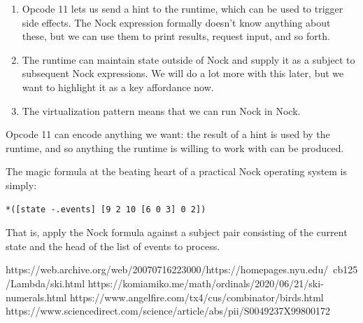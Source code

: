 \begin{enumerate}
  \item  Opcode 11 lets us send a hint to the runtime, which can be used to trigger side effects.  The Nock expression formally doesn't know anything about these, but we can use them to print results, request input, and so forth.
  \item  The runtime can maintain state outside of Nock and supply it as a subject to subsequent Nock expressions.  We will do a lot more with this later, but we want to highlight it as a key affordance now.
  \item  The virtualization pattern means that we can run Nock in Nock.
\end{enumerate}

Opcode 11 can encode anything we want:  the result of a hint is used by the runtime, and so anything the runtime is willing to work with can be produced.


The magic formula at the beating heart of a practical Nock operating system is simply:

\begin{lstlisting}[style=listingcode]
*([state -.events] [9 2 10 [6 0 3] 0 2])
\end{lstlisting}

\noindent
That is, apply the Nock formula against a subject pair consisting of the current state and the head of the list of events to process.



https://web.archive.org/web/20070716223000/https://homepages.nyu.edu/~cb125/Lambda/ski.html
https://komiamiko.me/math/ordinals/2020/06/21/ski-numerals.html
https://www.angelfire.com/tx4/cus/combinator/birds.html
https://www.sciencedirect.com/science/article/abs/pii/S0049237X99800172
